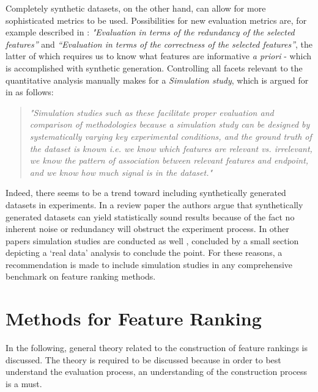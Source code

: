 \documentclass{article}
\begin{document}
Completely synthetic datasets, on the other hand, can allow for more sophisticated metrics to be used. Possibilities for new evaluation metrics are, for example described in \citep{solorio-fernandez_review_2020}: \textit{"Evaluation in terms of the redundancy of the selected features”} and \textit{“Evaluation in terms of the correctness of the selected features”}, the latter of which requires us to know what features are informative \textit{a priori} - which is accomplished with synthetic generation. Controlling all facets relevant to the quantitative analysis manually makes for a \textit{Simulation study}, which is argued for in \citep{urbanowicz_benchmarking_2018} as follows:

\begin{quote}
    \textit{"Simulation studies such as these facilitate proper evaluation and comparison of methodologies because a simulation study can be designed by systematically varying key experimental conditions, and the ground truth of the dataset is known i.e. we know which features are relevant vs. irrelevant, we know the pattern of association between relevant features and endpoint, and we know how much signal is in the dataset."}
\end{quote}

Indeed, there seems to be a trend toward including synthetically generated datasets in experiments. In a review paper \citep{bolon-canedo_review_2013} the authors argue that synthetically generated datasets can yield statistically sound results because of the fact no inherent noise or redundancy will obstruct the experiment process. In other papers simulation studies are conducted as well \citep{cai_online_2020} \citep{tang_high-dimensional_2020} \citep{li_distributed_2020}, concluded by a small section depicting a `real data' analysis to conclude the point. For these reasons, a recommendation is made to include simulation studies in any comprehensive benchmark on feature ranking methods.


\section{Methods for Feature Ranking}\label{section:methods for feature ranking}
In the following, general theory related to the construction of feature rankings is discussed. The theory is required to be discussed because in order to best understand the evaluation process, an understanding of the construction process is a must.
\end{document}
